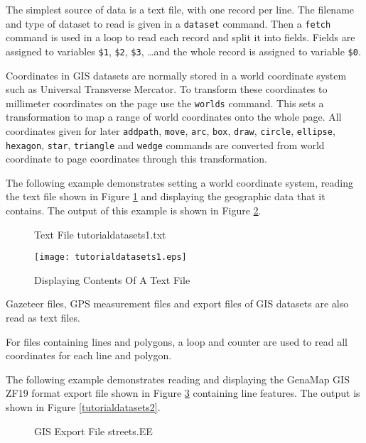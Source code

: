 The simplest source of data is a text file, with one record per line.  The
filename and type of dataset to read is given in a \texttt{dataset} command.
Then a \texttt{fetch} command is used in a loop to read each record
and split it into fields.
Fields are assigned to variables
\texttt{\$1}, \texttt{\$2}, \texttt{\$3}, \dots and the whole record is
assigned to variable \texttt{\$0}.

Coordinates in GIS datasets are normally stored
in a world coordinate system such as
Universal Transverse Mercator.  To transform these coordinates to millimeter
coordinates on the page use the \texttt{worlds} command.  This sets a
transformation to map a range of world coordinates onto the whole page.  All
coordinates given for later \texttt{addpath}, \texttt{move}, \texttt{arc},
\texttt{box},
\texttt{draw},
\texttt{circle},
\texttt{ellipse},
\texttt{hexagon},
\texttt{star},
\texttt{triangle}
and
\texttt{wedge}
commands are converted from world coordinate to page coordinates
through this transformation.

The following example demonstrates
setting a world coordinate system,
reading the text file shown in Figure
\ref{tutorialdatasets1txt} and displaying the
geographic data that it contains.  The output of this example is shown in
Figure \ref{tutorialdatasets1}.

\begin{figure}[htb]

\caption{Text File tutorialdatasets1.txt}
\label{tutorialdatasets1txt}
\end{figure}



\begin{figure}[htb]
\texttt{[image: tutorialdatasets1.eps]}
\caption{Displaying Contents Of A Text File}
\label{tutorialdatasets1}
\end{figure}

Gazeteer files, GPS measurement files and export files of GIS datasets
are also read as text files.

For files containing lines and polygons, a loop and counter
are used to read all coordinates for each line and polygon.

The following example demonstrates
reading and displaying the GenaMap GIS ZF19 format export file shown in Figure
\ref{streetsEE} containing line
features.
The output is shown in Figure \ref{tutorialdatasets2}.

\begin{figure}[htb]

\caption{GIS Export File streets.EE}
\label{streetsEE}
\end{figure}

